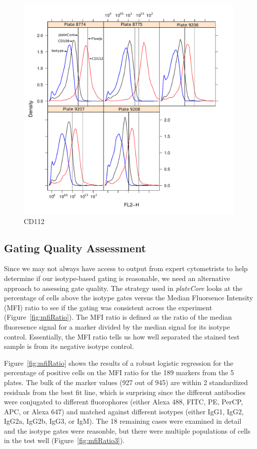 \documentclass[12pt]{article}
\newcommand{\Rpackage}[1]{{\textit{#1}}}
\begin{document}
\begin{figure}
\centering
\includegraphics{fjVSr3.pdf}
\caption{CD112}
\label{fig:pcVSman2}
\end{figure}

\clearpage
\subsection*{Gating Quality Assessment}

Since we may not always have access to output from expert cytometrists to
help determine if our isotype-based gating is reasonable, we need an alternative
approach to assessing gate quality. The strategy used in \Rpackage{plateCore}
looks at the percentage of cells above the isotype gates versus the Median
Fluorsence Intensity (MFI) ratio to see if the gating was consistent across the
experiment (Figure~\ref{fig:mfiRatio}). The MFI ratio is defined as the ratio
of the median fluoresence signal for a marker divided by the median signal for
its isotype control. Essentially, the MFI ratio tells us how well separated the
stained test sample is from its negative isotype control. 

Figure~\ref{fig:mfiRatio} shows the results of a robust logistic regression for
the percentage of positive cells on the MFI ratio for the 189 markers
from the 5 plates. The bulk of the marker values (927 out of 945) are within 2
standardized residuals from the best fit line, which is surprising since the
different antibodies were conjugated to different fluorophores (either Alexa
488, FITC, PE, PerCP, APC, or Alexa 647) and matched against different isotypes
(either IgG1, IgG2, IgG2a, IgG2b, IgG3, or IgM). The 18 remaining cases were
examined in detail and the isotype gates were reasonble, but there were
multiple populations of cells in the test well (Figure~\ref{fig:mfiRatio3}). 
\end{document}
